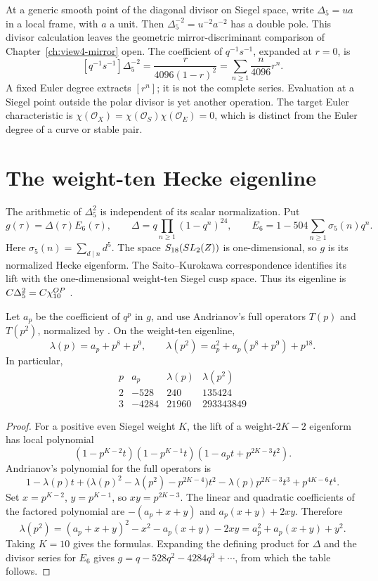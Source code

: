 At a generic smooth point of the diagonal divisor on Siegel space,
write \(\Delta_5=u a\) in a local frame, with \(a\) a unit.
Then \(\Delta_5^{-2}=u^{-2}a^{-2}\) has a double pole.
This divisor calculation leaves the geometric mirror-discriminant
comparison of Chapter~\ref{ch:view4-mirror} open.
The coefficient of \(q^{-1}s^{-1}\), expanded at \(r=0\), is
\[
 [q^{-1}s^{-1}]\Delta_5^{-2}
 =\frac{r}{4096(1-r)^2}
 =\sum_{n\ge1}\frac n{4096}r^n.
\]
A fixed Euler degree extracts \([r^n]\); it is not the complete
series.  Evaluation at a Siegel point outside the polar divisor
is yet another operation.  The target Euler characteristic is
\(\chi(\mathcal O_X)=\chi(\mathcal O_S)\chi(\mathcal O_E)=0\),
which is distinct from the Euler degree of a curve or stable pair.

\section{The weight-ten Hecke eigenline}
\label{sec:spin-l-factor}

The arithmetic of \(\Delta_5^2\) is independent of its scalar
normalization.  Put
\[
 g(\tau)=\Delta(\tau)E_6(\tau),\qquad
 \Delta=q\prod_{n\ge1}(1-q^n)^{24},\qquad
 E_6=1-504\sum_{n\ge1}\sigma_5(n)q^n.
\]
Here \(\sigma_5(n)=\sum_{d\mid n}d^5\).  The space
\(S_{18}(SL_2(Z))\) is one-dimensional, so \(g\)
is its normalized Hecke eigenform.  The Saito--Kurokawa
correspondence identifies its lift with the one-dimensional
weight-ten Siegel cusp space.  Thus its eigenline is
\(C\Delta_5^2=C\chi_{10}^{OP}\)
\cite[Theorem~2 and its corollary]{ZagierSK}.

\begin{proposition}
\label{prop:zbps-sk-hecke}
Let \(a_p\) be the coefficient of \(q^p\) in \(g\), and use
Andrianov's full operators \(T(p)\) and \(T(p^2)\), normalized
by \cite[Theorem~3.1.1]{Andr74}.  On the weight-ten eigenline,
\[
 \lambda(p)=a_p+p^8+p^9,\qquad
 \lambda(p^2)=a_p^2+a_p(p^8+p^9)+p^{18}.
\]
In particular,
\[
 \begin{array}{c|rrr}
 p&a_p&\lambda(p)&\lambda(p^2)\\\hline
 2&-528&240&135424\\
 3&-4284&21960&293343849
 \end{array}
\]
\end{proposition}
\begin{proof}
For a positive even Siegel weight \(K\), the lift of a
weight-\(2K-2\) eigenform has local polynomial
\[
 (1-p^{K-2}t)(1-p^{K-1}t)
          (1-a_pt+p^{2K-3}t^2).
\]
Andrianov's polynomial for the full operators is
\[
 1-\lambda(p)t+
 \bigl(\lambda(p)^2-\lambda(p^2)-p^{2K-4}\bigr)t^2
 -\lambda(p)p^{2K-3}t^3+p^{4K-6}t^4.
\]
Set \(x=p^{K-2}\), \(y=p^{K-1}\), so \(xy=p^{2K-3}\).
The linear and quadratic coefficients of the factored polynomial
are \(-(a_p+x+y)\) and \(a_p(x+y)+2xy\).  Therefore
\[
 \lambda(p^2)=(a_p+x+y)^2-x^2-a_p(x+y)-2xy
             =a_p^2+a_p(x+y)+y^2.
\]
Taking \(K=10\) gives the formulas.  Expanding the defining
product for \(\Delta\) and the divisor series for \(E_6\) gives
\(g=q-528q^2-4284q^3+\cdots\), from which the table follows.
\end{proof}

